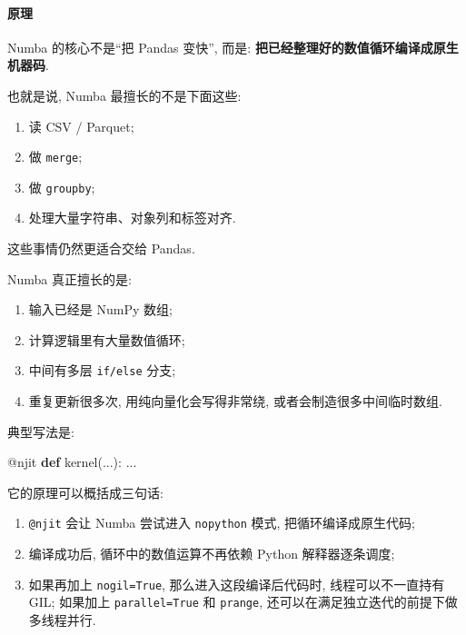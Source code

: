 \documentclass[11pt]{article}
\providecommand{\tightlist}{%
      \setlength{\itemsep}{0pt}\setlength{\parskip}{0pt}}
\newenvironment{Shaded}{}{}
\newcommand{\KeywordTok}[1]{\textcolor[rgb]{0.00,0.44,0.13}{\textbf{{#1}}}}
\newcommand{\NormalTok}[1]{{#1}}
\newcommand{\AttributeTok}[1]{\textcolor[rgb]{0.49,0.56,0.16}{{#1}}}
\begin{document}
    \paragraph{原理}\label{ux539fux7406}

    Numba 的核心不是``把 Pandas 变快'', 而是:
\textbf{把已经整理好的数值循环编译成原生机器码}.

也就是说, Numba 最擅长的不是下面这些:

\begin{enumerate}
\def\labelenumi{\arabic{enumi}.}
\tightlist
\item
  读 CSV / Parquet;
\item
  做 \texttt{merge};
\item
  做 \texttt{groupby};
\item
  处理大量字符串、对象列和标签对齐.
\end{enumerate}

这些事情仍然更适合交给 Pandas.

Numba 真正擅长的是:

\begin{enumerate}
\def\labelenumi{\arabic{enumi}.}
\tightlist
\item
  输入已经是 NumPy 数组;
\item
  计算逻辑里有大量数值循环;
\item
  中间有多层 \texttt{if/else} 分支;
\item
  重复更新很多次, 用纯向量化会写得非常绕, 或者会制造很多中间临时数组.
\end{enumerate}

典型写法是:

\begin{Shaded}
\begin{Highlighting}[]
\AttributeTok{@njit}
\KeywordTok{def}\NormalTok{ kernel(...):}
\NormalTok{    ...}
\end{Highlighting}
\end{Shaded}

它的原理可以概括成三句话:

\begin{enumerate}
\def\labelenumi{\arabic{enumi}.}
\tightlist
\item
  \texttt{@njit} 会让 Numba 尝试进入 \texttt{nopython} 模式,
  把循环编译成原生代码;
\item
  编译成功后, 循环中的数值运算不再依赖 Python 解释器逐条调度;
\item
  如果再加上 \texttt{nogil=True}, 那么进入这段编译后代码时,
  线程可以不一直持有 GIL; 如果加上 \texttt{parallel=True} 和
  \texttt{prange}, 还可以在满足独立迭代的前提下做多线程并行.
\end{enumerate}
\end{document}
